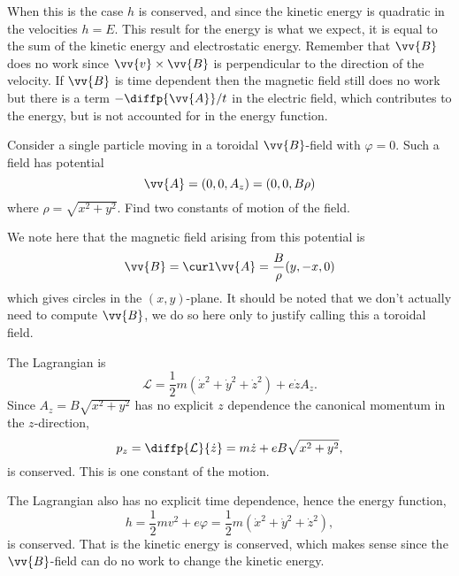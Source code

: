 \documentclass[fleqn]{NotesClass}
\newcommand*{\lagrangian}{\mathcal{L}}
\begin{document}
    When this is the case \(h\) is conserved, and since the kinetic energy is quadratic in the velocities \(h = E\).
    This result for the energy is what we expect, it is equal to the sum of the kinetic energy and electrostatic energy.
    Remember that \(\vv{B}\) does no work since \(\vv{v} \times \vv{B}\) is perpendicular to the direction of the velocity.
    If \(\vv{B}\) is time dependent then the magnetic field still does no work but there is a term \(-\diffp{\vv{A}}/{t}\) in the electric field, which contributes to the energy, but is not accounted for in the energy function.
    
    \begin{exm}{}{}
        Consider a single particle moving in a toroidal \(\vv{B}\)-field with \(\varphi = 0\).
        Such a field has potential
        \begin{equation}
            \vv{A} = (0, 0, A_z) = (0, 0, B\rho)
        \end{equation}
        where \(\rho = \sqrt{x^2 + y^2}\).
        Find two constants of motion of the field.
        
        We note here that the magnetic field arising from this potential is
        \begin{equation}
            \vv{B} = \curl\vv{A} = \frac{B}{\rho} (y, -x, 0)
        \end{equation}
        which gives circles in the \((x, y)\)-plane.
        It should be noted that we don't actually need to compute \(\vv{B}\), we do so here only to justify calling this a toroidal field.
        
        The Lagrangian is
        \begin{equation}
            \lagrangian = \frac{1}{2}m(\dot{x}^2 + \dot{y}^2 + \dot{z}^2) + e\dot{z}A_z.
        \end{equation}
        Since \(A_z = B\sqrt{x^2 + y^2}\) has no explicit \(z\) dependence the canonical momentum in the \(z\)-direction,
        \begin{equation}
            p_z = \diffp{\lagrangian}{\dot{z}} = m\dot{z} + eB\sqrt{x^2 + y^2},
        \end{equation}
        is conserved.
        This is one constant of the motion.
        
        The Lagrangian also has no explicit time dependence, hence the energy function,
        \begin{equation}
            h = \frac{1}{2}mv^2 + e\varphi = \frac{1}{2}m(\dot{x}^2 + \dot{y}^2 + \dot{z}^2),
        \end{equation}
        is conserved.
        That is the kinetic energy is conserved, which makes sense since the \(\vv{B}\)-field can do no work to change the kinetic energy.
    \end{exm}
    
\end{document}
